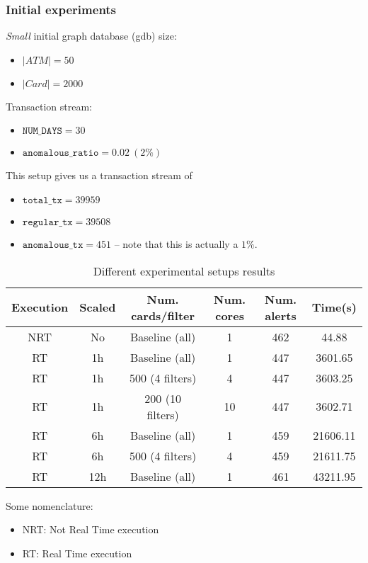 \subsubsection{Initial experiments}

\textit{Small} initial graph database (gdb) size:
\begin{itemize}
  \item $|ATM| = 50$
  \item $|Card| = 2000$
\end{itemize}

Transaction stream:
\begin{itemize}
  \item $\texttt{NUM\_DAYS} = 30$
  \item $\texttt{anomalous\_ratio} = 0.02\ (2\%)$ 
\end{itemize}

This setup gives us a transaction stream of 
\begin{itemize}
  \item $\texttt{total\_tx} = 39959$
  \item $\texttt{regular\_tx} = 39508$
  \item $\texttt{anomalous\_tx} = 451$ -- note that this is actually a $1\%$.
\end{itemize}

\begin{table}[H]
\centering
\begin{tabular}{|c|c|c|c|c|c|}
  \hline
  Execution & Scaled   & Num. cards/filter& Num. cores & Num. alerts & Time(s) \\ \hline
  NRT & No & Baseline (all) & 1 & 462 & 44.88 \\ \hline
  RT  & 1h & Baseline (all) & 1 & 447 & 3601.65\\ \hline
  RT  & 1h & 500 (4 filters) & 4 & 447 & 3603.25\\ \hline
  RT  & 1h & 200 (10 filters) & 10 & 447 & 3602.71\\ \hline
  RT  & 6h & Baseline (all) & 1 & 459 & 21606.11 \\ \hline
  RT  & 6h & 500 (4 filters) & 4 & 459 & 21611.75 \\ \hline
  RT  & 12h & Baseline (all) & 1 & 461 & 43211.95 \\ \hline
\end{tabular}
\caption{Different experimental setups results}
\label{table:small-results}
\end{table}

Some nomenclature:
\begin{itemize}
  \item NRT: Not Real Time execution
  \item RT: Real Time execution
\end{itemize}

